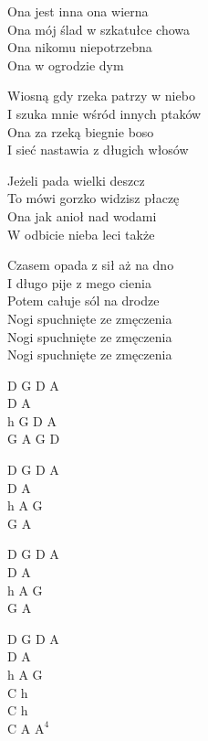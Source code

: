 \begin{text}
    Ona jest inna ona wierna\\
    Ona mój ślad w szkatułce chowa\\
    Ona nikomu niepotrzebna\\
    Ona w ogrodzie dym

    Wiosną gdy rzeka patrzy w niebo\\
    I szuka mnie wśród innych ptaków\\
    Ona za rzeką biegnie boso\\
    I sieć nastawia z długich włosów

    Jeżeli pada wielki deszcz\\
    To mówi gorzko widzisz płaczę\\
    Ona jak anioł nad wodami\\
    W odbicie nieba leci także

    Czasem opada z sił aż na dno\\
    I długo pije z mego cienia\\
    Potem całuje sól na drodze\\
    Nogi spuchnięte ze zmęczenia\\
    Nogi spuchnięte ze zmęczenia\\
    Nogi spuchnięte ze zmęczenia
\end{text}
\begin{chord}
    D G D A\\
    D A\\
    h G D A\\
    G A G D

    D G D A\\
    D A\\
    h A G\\
    G A

    D G D A\\
    D A\\
    h A G\\
    G A

    D G D A\\
    D A\\
    h A G\\
    C h\\
    C h\\
    C A $\mathrm{A^4}$
\end{chord}
